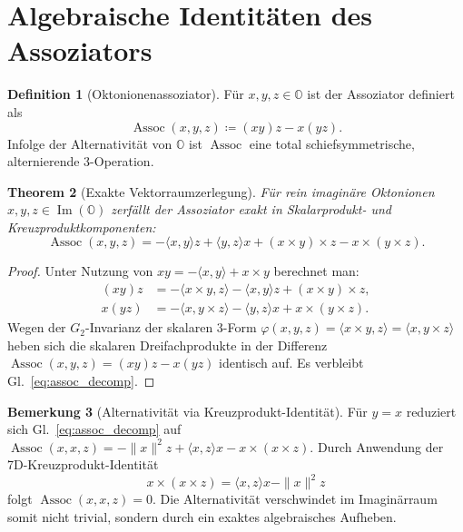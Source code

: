 \documentclass[11pt,a4paper]{article}
\newtheorem{theorem}{Theorem}[section]
\theoremstyle{definition}
\newtheorem{definition}[theorem]{Definition}
\newtheorem{remark}[theorem]{Bemerkung}
\newcommand{\Oalg}{\mathbb{O}}
\newcommand{\ImO}{\operatorname{Im}(\mathbb{O})}
\newcommand{\Assoc}{\operatorname{Assoc}}
\begin{document}
	\section{Algebraische Identitäten des Assoziators}
	
	\begin{definition}[Oktonionenassoziator]
		Für $x, y, z \in \Oalg$ ist der Assoziator definiert als
		\begin{equation}
			\Assoc(x,y,z) \coloneqq (xy)z - x(yz).
		\end{equation}
		Infolge der Alternativität von $\Oalg$ ist $\Assoc$ eine total schiefsymmetrische, alternierende 3-Operation.
	\end{definition}
	
	\begin{theorem}[Exakte Vektorraumzerlegung]
		Für rein imaginäre Oktonionen $x, y, z \in \ImO$ zerfällt der Assoziator exakt in Skalarprodukt- und Kreuzproduktkomponenten:
		\begin{equation}
			\label{eq:assoc_decomp}
			\Assoc(x,y,z) = -\langle x,y \rangle z + \langle y,z \rangle x + (x \times y) \times z - x \times (y \times z).
		\end{equation}
	\end{theorem}
	
	\begin{proof}
		Unter Nutzung von $xy = -\langle x,y \rangle + x \times y$ berechnet man:
		\begin{align}
			(xy)z &= -\langle x \times y, z \rangle - \langle x,y \rangle z + (x \times y) \times z, \\
			x(yz) &= -\langle x, y \times z \rangle - \langle y,z \rangle x + x \times (y \times z).
		\end{align}
		Wegen der $G_2$-Invarianz der skalaren 3-Form $\varphi(x,y,z) = \langle x \times y, z \rangle = \langle x, y \times z \rangle$ heben sich die skalaren Dreifachprodukte in der Differenz $\Assoc(x,y,z) = (xy)z - x(yz)$ identisch auf. Es verbleibt Gl.~\eqref{eq:assoc_decomp}.
	\end{proof}
	
	\begin{remark}[Alternativität via Kreuzprodukt-Identität]
		Für $y = x$ reduziert sich Gl.~\eqref{eq:assoc_decomp} auf $\Assoc(x,x,z) = -\|x\|^2 z + \langle x,z \rangle x - x \times (x \times z)$. Durch Anwendung der 7D-Kreuzprodukt-Identität
		\begin{equation}
			x \times (x \times z) = \langle x,z \rangle x - \|x\|^2 z
		\end{equation}
		folgt $\Assoc(x,x,z) = 0$. Die Alternativität verschwindet im Imaginärraum somit nicht trivial, sondern durch ein exaktes algebraisches Aufheben.
	\end{remark}
	
\end{document}
